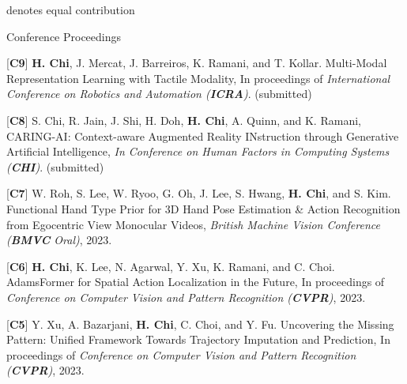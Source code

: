 

\vspace{-1em}
\begin{flushright}
{\scriptsize * denotes equal contribution}
\end{flushright}
\vspace{-1em}

\begin{cventries}
\cvpub
{Conference Proceedings} %
{ %
\begin{cvitems}
    \item {[\textbf{C9}] \textbf{H. Chi}, J. Mercat, J. Barreiros, K. Ramani, and T. Kollar. Multi-Modal Representation Learning with Tactile Modality, In proceedings of \textit{International Conference on Robotics and Automation (\textbf{ICRA})}. (submitted)}
    \item {[\textbf{C8}] S. Chi, R. Jain,  J. Shi,  H. Doh, \textbf{H. Chi}, A. Quinn, and K. Ramani,  CARING-AI: Context-aware Augmented Reality INstruction through Generative Artificial Intelligence, \textit{In Conference on Human Factors in Computing Systems (\textbf{CHI})}. (submitted)}
    \item {[\textbf{C7}] W. Roh, S. Lee, W. Ryoo, G. Oh, J. Lee, S. Hwang, \textbf{H. Chi}, and S. Kim. Functional Hand Type Prior for 3D Hand Pose Estimation \& Action Recognition from Egocentric View Monocular Videos, \textit{British Machine Vision Conference (\textbf{BMVC} Oral)}, 2023.}
    \item {[\textbf{C6}] \textbf{H. Chi}, K. Lee, N. Agarwal, Y. Xu, K. Ramani, and C. Choi. AdamsFormer for Spatial Action Localization in the Future, In proceedings of \textit{Conference on Computer Vision and Pattern Recognition (\textbf{CVPR})}, 2023.}
    \item {[\textbf{C5}] Y. Xu, A. Bazarjani, \textbf{H. Chi}, C. Choi, and Y. Fu. Uncovering the Missing Pattern: Unified Framework Towards Trajectory Imputation and Prediction, In proceedings of \textit{Conference on Computer Vision and Pattern Recognition (\textbf{CVPR})}, 2023.}

\end{cvitems}}
\end{cventries}
